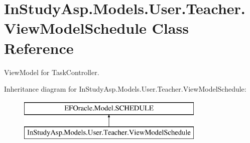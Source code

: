 \hypertarget{class_in_study_asp_1_1_models_1_1_user_1_1_teacher_1_1_view_model_schedule}{}\section{In\+Study\+Asp.\+Models.\+User.\+Teacher.\+View\+Model\+Schedule Class Reference}
\label{class_in_study_asp_1_1_models_1_1_user_1_1_teacher_1_1_view_model_schedule}


View\+Model for Task\+Controller.  


Inheritance diagram for In\+Study\+Asp.\+Models.\+User.\+Teacher.\+View\+Model\+Schedule\+:\begin{figure}[H]
\begin{center}
\leavevmode
\includegraphics[height=2.000000cm]{class_in_study_asp_1_1_models_1_1_user_1_1_teacher_1_1_view_model_schedule}
\end{center}
\end{figure}
